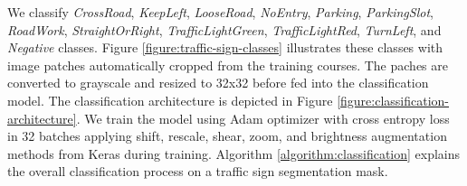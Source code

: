 We classify \textit{CrossRoad}, \textit{KeepLeft}, \textit{LooseRoad},
\textit{NoEntry}, \textit{Parking}, \textit{ParkingSlot}, \textit{RoadWork},
\textit{StraightOrRight}, \textit{TrafficLightGreen}, \textit{TrafficLightRed},
\textit{TurnLeft}, and \textit{Negative} classes. Figure
\ref{figure:traffic-sign-classes} illustrates these classes with image patches
automatically cropped from the training courses. The paches are converted to
grayscale and resized to 32x32 before fed into the classification model. The
classification architecture is depicted in Figure
\ref{figure:classification-architecture}. We train the model using Adam
optimizer with cross entropy loss in 32 batches applying shift, rescale, shear,
zoom, and brightness augmentation methods from Keras during
training\cite{Abadi2015TF, Chollet2015Keras}. Algorithm
\ref{algorithm:classification} explains the overall classification process on a
traffic sign segmentation mask.

